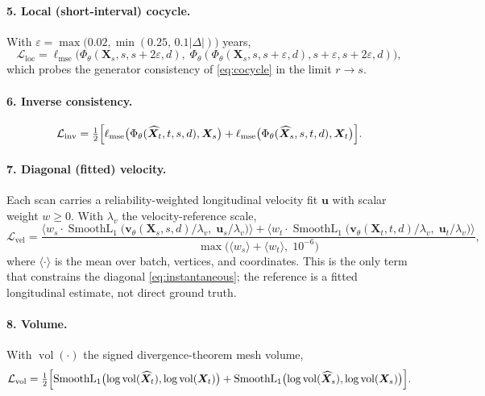 \documentclass[11pt]{article}
\newcommand{\X}{\bm{X}}
\newcommand{\vel}{\bm{v}}
\newcommand{\Loss}{\mathcal{L}}
\newcommand{\SL}{\operatorname{SmoothL}_1}
\newcommand{\vol}{\operatorname{vol}}
\begin{document}
\paragraph{5. Local (short-interval) cocycle.} With
$\varepsilon = \max\bigl(0.02, \min(0.25,\, 0.1|\Delta|)\bigr)$ years,
\begin{equation}
  \Loss_{\mathrm{loc}} = \ell_{\mathrm{mse}}\bigl(
    \Phi_\theta(\X_s, s, s + 2\varepsilon, d),\;
    \Phi_\theta(\Phi_\theta(\X_s, s, s+\varepsilon, d), s+\varepsilon, s+2\varepsilon, d)\bigr),
\end{equation}
which probes the generator consistency of \eqref{eq:cocycle} in the limit $r \to s$.

\paragraph{6. Inverse consistency.}
\begin{equation}
  \Loss_{\mathrm{inv}} = \tfrac{1}{2}\Bigl[
    \ell_{\mathrm{mse}}\bigl(\Phi_\theta(\widehat{\X}_t, t, s, d), \X_s\bigr)
  + \ell_{\mathrm{mse}}\bigl(\Phi_\theta(\widehat{\X}_s, s, t, d), \X_t\bigr) \Bigr].
\end{equation}

\paragraph{7. Diagonal (fitted) velocity.} Each scan carries a reliability-weighted
longitudinal velocity fit $\bm{u}$ with scalar weight $w \ge 0$. With $\lambda_v$ the
velocity-reference scale,
\begin{equation}
  \Loss_{\mathrm{vel}} = \frac{
    \bigl\langle w_s \cdot \SL\bigl(\vel_\theta(\X_s,s,d)/\lambda_v,\; \bm{u}_s/\lambda_v\bigr)\bigr\rangle
  + \bigl\langle w_t \cdot \SL\bigl(\vel_\theta(\X_t,t,d)/\lambda_v,\; \bm{u}_t/\lambda_v\bigr)\bigr\rangle
  }{\max\bigl(\langle w_s\rangle + \langle w_t\rangle,\; 10^{-6}\bigr)} ,
\end{equation}
where $\langle\cdot\rangle$ is the mean over batch, vertices, and coordinates. This is the
only term that constrains the diagonal \eqref{eq:instantaneous}; the reference is a fitted
longitudinal estimate, not direct ground truth.

\paragraph{8. Volume.} With $\vol(\cdot)$ the signed divergence-theorem mesh volume,
\begin{equation}
  \Loss_{\mathrm{vol}} = \tfrac{1}{2}\Bigl[
    \SL\bigl(\log \vol(\widehat{\X}_t), \log \vol(\X_t)\bigr) +
    \SL\bigl(\log \vol(\widehat{\X}_s), \log \vol(\X_s)\bigr) \Bigr].
\end{equation}
\end{document}
